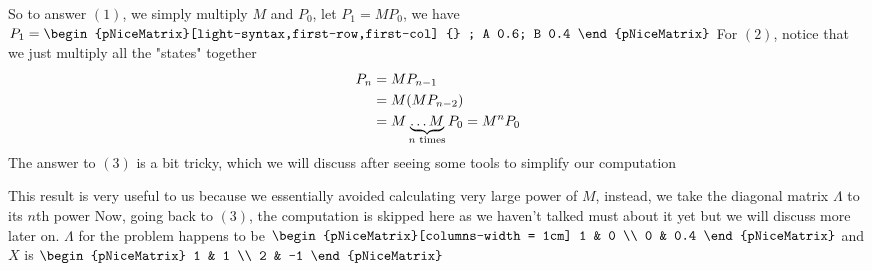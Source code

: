 \documentclass{report}
\begin{document}
So to answer $(1)$, we simply multiply $M$ and $P_{0}$, let $P_{1} = MP_{0}$, we have $P_{1} = 
	\begin{pNiceMatrix}[light-syntax,first-row,first-col]
		{}	  ;
		A	 0.6;
		B	 0.4
	\end{pNiceMatrix}
$
For $(2)$, notice that we just multiply all the "states" together
\begin{align}
	P_n &= MP_{n-1} \\
	&= M(MP_{n-2}) \\
	&= M \underbrace{\ldots M}_{n \textup{ times}} P_{0}= M^{n}P_{0} 
\end{align}
The answer to $(3)$ is a bit tricky, which we will discuss after seeing some tools to simplify our computation

This result is very useful to us because we essentially avoided calculating very large power of $M$, instead, we take the diagonal matrix $\varLambda$ to its $n$th power
Now, going back to $(3)$, the computation is skipped here as we haven't talked must about it yet but we will discuss more later on.
$\varLambda$ for the problem happens to be 
	$\begin{pNiceMatrix}[columns-width = 1cm]
		1 & 0 \\
		0 & 0.4
	\end{pNiceMatrix}$
and $X$ is 
	$\begin{pNiceMatrix}
		1 & 1 \\
		2 & -1	
	\end{pNiceMatrix}$
\end{document}
